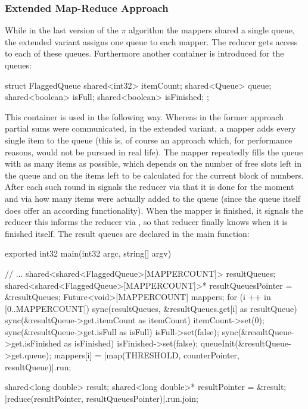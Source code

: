\subsubsection{Extended Map-Reduce Approach}
While in the last version of the $\pi$ algorithm the mappers shared a single queue, the extended variant assigns one queue to each mapper. The reducer gets access to each of these queues. Furthermore another container is introduced for the queues:
\begin{ccode}
struct FlaggedQueue { 
  shared<int32> itemCount; 
  shared<Queue> queue; 
  shared<boolean> isFull; 
  shared<boolean> isFinished; 
};
\end{ccode}
This container is used in the following way. Whereas in the former approach partial sums were communicated, in the extended variant, a mapper adds every single item to the queue (this is, of course an approach which, for performance reasons, would not be pursued in real life). The mapper repeatedly fills the queue with as many items as possible, which depends on the number of free slots left in the queue and on the items left to be calculated for the current block of numbers. After each such round in signals the reducer via  that it is done for the moment and via  how many items were actually added to the queue (since the queue itself does offer an according functionality). When the mapper is finished, it signals the reducer this informs the reducer via , so that reducer finally knows when it is finished itself. The result queues are declared in the main function:
\begin{ccode}
exported int32 main(int32 argc, string[] argv) { 
  // ...
  shared<shared<FlaggedQueue>[MAPPERCOUNT]> resultQueues; 
  shared<shared<FlaggedQueue>[MAPPERCOUNT]>* resultQueuesPointer = &resultQueues; 
  Future<void>[MAPPERCOUNT] mappers; 
  for (i ++ in [0..MAPPERCOUNT[) { 
    sync(resultQueues, &resultQueues.get[i] as resultQueue) { 
      sync(&resultQueue->get.itemCount as itemCount) { itemCount->set(0); } 
      sync(&resultQueue->get.isFull as isFull) { isFull->set(false); } 
      sync(&resultQueue->get.isFinished as isFinished) { isFinished->set(false); } 
      queueInit(&resultQueue->get.queue); 
      mappers[i] = |map(THRESHOLD, counterPointer, resultQueue)|.run; 
    } 
  }
   
  shared<long double> result; 
  shared<long double>* resultPointer = &result; 
  |reduce(resultPointer, resultQueuesPointer)|.run.join; 
}
\end{ccode}
